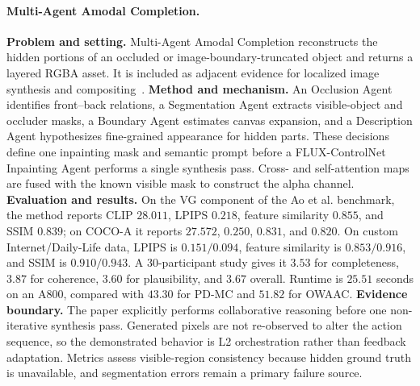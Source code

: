 \paragraph{Multi-Agent Amodal Completion.}
\textbf{Problem and setting.} Multi-Agent Amodal Completion reconstructs the hidden portions of an occluded or image-boundary-truncated object and returns a layered RGBA asset. It is included as adjacent evidence for localized image synthesis and compositing~\cite{avg250917757}. \textbf{Method and mechanism.} An Occlusion Agent identifies front--back relations, a Segmentation Agent extracts visible-object and occluder masks, a Boundary Agent estimates canvas expansion, and a Description Agent hypothesizes fine-grained appearance for hidden parts. These decisions define one inpainting mask and semantic prompt before a FLUX-ControlNet Inpainting Agent performs a single synthesis pass. Cross- and self-attention maps are fused with the known visible mask to construct the alpha channel. \textbf{Evaluation and results.} On the VG component of the Ao et al. benchmark, the method reports CLIP $28.011$, LPIPS $0.218$, feature similarity $0.855$, and SSIM $0.839$; on COCO-A it reports $27.572$, $0.250$, $0.831$, and $0.820$. On custom Internet/Daily-Life data, LPIPS is $0.151/0.094$, feature similarity is $0.853/0.916$, and SSIM is $0.910/0.943$. A 30-participant study gives it $3.53$ for completeness, $3.87$ for coherence, $3.60$ for plausibility, and $3.67$ overall. Runtime is $25.51$ seconds on an A800, compared with $43.30$ for PD-MC and $51.82$ for OWAAC. \textbf{Evidence boundary.} The paper explicitly performs collaborative reasoning before one non-iterative synthesis pass. Generated pixels are not re-observed to alter the action sequence, so the demonstrated behavior is L2 orchestration rather than feedback adaptation. Metrics assess visible-region consistency because hidden ground truth is unavailable, and segmentation errors remain a primary failure source.

